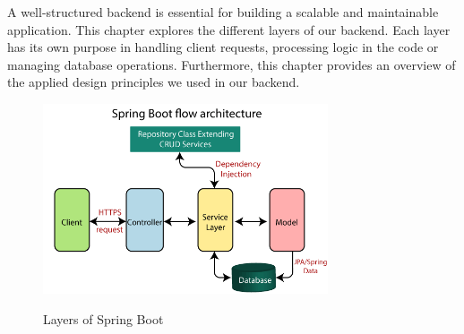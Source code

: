 \Author{\daAuthorThree}

    A well-structured backend is essential for building a scalable and maintainable application. This chapter explores the different layers of our backend. Each layer has its own purpose in handling client requests, processing logic in the code or managing database operations. Furthermore, this chapter provides an overview of the applied design principles we used in our backend.

    \begin{figure} [H]
        \centering
        \includegraphics [width=0.75\textwidth] {images/andreas/backendstructure/springBootLayers.png}
        \caption{Layers of Spring Boot}
        \cite{Andi:SpringLayersPic}
    \end{figure}


